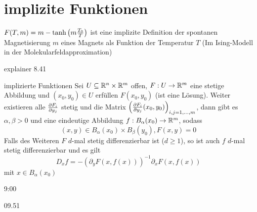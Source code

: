 \section{implizite Funktionen}
\begin{example}
$F(T,m) = m - \tanh\left(m\frac{T_0}{T}\right)$ ist eine implizite Definition der spontanen Magnetisierung $m$ eines Magnets als Funktion der Temperatur $T$ (Im Ising-Modell in der Molekularfeldapproximation)
\end{example}

explainer 8.41

\begin{satz}{implizierte Funktionen}{}
Sei $U \subseteq \mathbb{R}^n\times \mathbb{R}^m$ offen, $F: U \to \mathbb{R}^m$ eine stetige Abbildung und $(x_0, y_0) \in U$ erfüllen $F(x_0,y_0)$ (ist eine Lösung). Weiter existieren alle $\diffp[]{F_i}{y_j}$ stetig und die Matrix $\bk{\diffp[]{F_i}{y_j}(x_0, y_0)}_{i,j=1,...,m}$, dann gibt es $\alpha, \beta > 0$ und eine eindeutige Abbildung $f:B_\alpha(x_0) \to \mathbb{R}^m$, sodass
$$(x,y) \in B_\alpha(x_0) \times B_\beta(y_0), F(x,y)=0$$
Falls des Weiteren $F$ $d$-mal stetig differenzierbar ist ($d \geq 1$), so ist auch $f$ $d$-mal stetig differenzierbar und es gilt
$$D_xf = -(\partial_yF(x,f(x)))^{-1} \partial_x F(x,f(x))$$
mit $x \in B_\alpha(x_0)$
\end{satz}
9:00

09.51